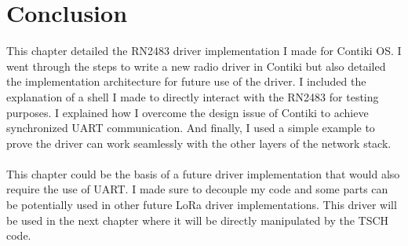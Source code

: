 \section{Conclusion}

This chapter detailed the RN2483 driver implementation I made for Contiki OS.
I went through the steps to write a new radio driver in Contiki but also
detailed the implementation architecture for future use of the driver.
I included the explanation of a shell I made to directly interact with the
RN2483 for testing purposes.
I explained how I overcome the design issue of Contiki to achieve
synchronized UART communication.
And finally, I used a simple example to prove the driver can work seamlessly
with the other layers of the network stack.

\paragraph{}

This chapter could be the basis of a future driver implementation that would
also require the use of UART.
I made sure to decouple my code and some parts can be potentially used in
other future LoRa driver implementations.
This driver will be used in the next chapter where it will be directly
manipulated by the TSCH code.
